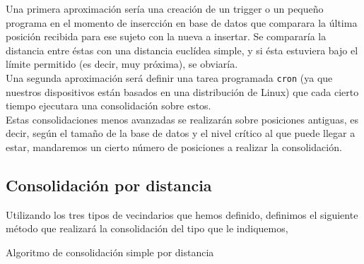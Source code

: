\documentclass[a4paper, 12pt]{article}
\begin{document}
Una primera aproximaci\'on ser\'ia una creaci\'on de un trigger o un peque\~no programa en el momento de insercci\'on en base de datos que comparara la \'ultima posici\'on recibida para ese sujeto con la nueva a insertar. Se comparar\'ia la distancia entre \'estas con una distancia eucl\'idea simple, y si \'esta estuviera bajo el l\'imite permitido (es decir, muy pr\'oxima), se obviar\'ia. \\

Una segunda aproximaci\'on ser\'a definir una tarea programada \texttt{cron} (ya que nuestros dispositivos est\'an basados en una distribuci\'on de Linux) que cada cierto tiempo ejecutara una consolidaci\'on sobre estos. \\

Estas consolidaciones menos avanzadas se realizar\'an sobre posiciones antiguas, es decir, seg\'un el tama\~no de la base de datos y el nivel cr\'itico al que puede llegar a estar, mandaremos un cierto n\'umero de posiciones a realizar la consolidaci\'on. \\

\subsection{Consolidaci\'on por distancia}

Utilizando los tres tipos de vecindarios que hemos definido, definimos el siguiente m\'etodo que realizar\'a la consolidaci\'on del tipo que le indiquemos, \\


\pagebreak

\begin{algorithm}[h]\label{consolidationByDistance}
\begin{algorithmic}[1]
        \Else
        \EndIf
    \EndIf
        \Else
        \EndIf
    \EndIf
        \Else
        \EndIf
    \EndIf
\EndFor
\EndFunction
\end{algorithmic}
\caption{\label{alg:consolidationByDinstace} Algoritmo de consolidaci\'on simple por distancia}
\end{algorithm}
\end{document}
